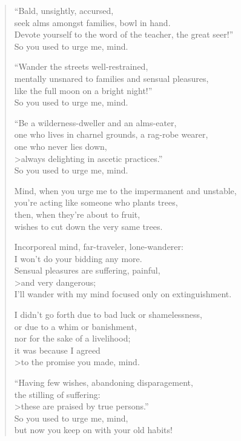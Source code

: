 \documentclass[12pt,openany]{book}%
\begin{document}
\begin{verse}
“Bald, unsightly, accursed, \\
seek alms amongst families, bowl in hand. \\
Devote yourself to the word of the teacher, the great seer!” \\
So you used to urge me, mind. 

“Wander the streets well-restrained, \\
mentally unsnared to families and sensual pleasures, \\
like the full moon on a bright night!” \\
So you used to urge me, mind. 

“Be a wilderness-dweller and an alms-eater, \\
one who lives in charnel grounds, a rag-robe wearer, \\
one who never lies down, \\>always delighting in ascetic practices.” \\
So you used to urge me, mind. 

Mind, when you urge me to the impermanent and unstable, \\
you’re acting like someone who plants trees, \\
then, when they’re about to fruit, \\
wishes to cut down the very same trees. 

Incorporeal mind, far-traveler, lone-wanderer: \\
I won’t do your bidding any more. \\
Sensual pleasures are suffering, painful, \\>and very dangerous; \\
I’ll wander with my mind focused only on extinguishment. 

I didn’t go forth due to bad luck or shamelessness, \\
or due to a whim or banishment, \\
nor for the sake of a livelihood; \\
it was because I agreed \\>to the promise you made, mind. 

“Having few wishes, abandoning disparagement, \\
the stilling of suffering: \\>these are praised by true persons.” \\
So you used to urge me, mind, \\
but now you keep on with your old habits! 


\end{verse}
\end{document}

